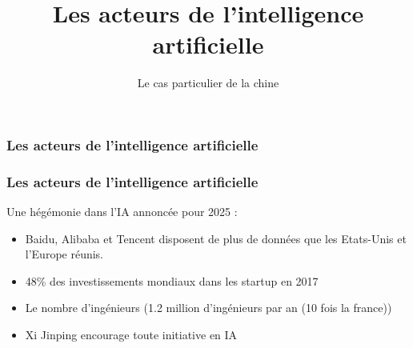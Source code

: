 \documentclass{formation}
\title{Les acteurs de l'intelligence artificielle}
\subtitle{Le cas particulier de la chine}
\begin{document}
\maketitle

\begin{frame}
  \frametitle{Les acteurs de l'intelligence artificielle}
\end{frame}

\begin{frame}
  \frametitle{Les acteurs de l'intelligence artificielle}
  Une hégémonie dans l'IA annoncée pour 2025 :
  \begin{itemize}
  \item Baidu, Alibaba et Tencent disposent de plus de données que les Etats-Unis et l’Europe réunis.
  \item 48\% des investissements mondiaux dans les startup en 2017
  \item Le nombre d'ingénieurs (1.2 million d'ingénieurs par an (10 fois la france))
  \item Xi Jinping encourage toute initiative en IA
  \end{itemize}
\end{frame}
\end{document}
